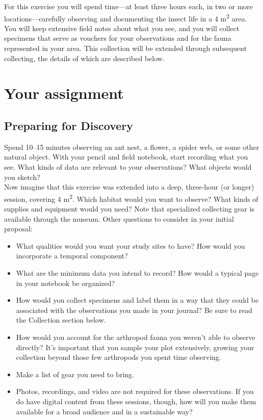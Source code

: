 \documentclass[letterpaper, 11pt]{article}
\begin{document}
\noindent{}For this exercise you will spend time---at least three hours each, in two or more locations---carefully observing and documenting the insect life in a 4 m\textsuperscript{2} area. You will keep extensive field notes about what you see, and you will collect specimens that serve as vouchers for your observations and for the fauna represented in your area. This collection will be extended through subsequent collecting, the details of which are described below.

\section*{Your assignment}

\subsection*{Preparing for Discovery}
Spend 10--15 minutes observing an ant nest, a flower, a spider web, or some other natural object. With your pencil and field notebook, start recording what you see. What kinds of data are relevant to your observations? What objects would you sketch? \\

\noindent{}Now imagine that this exercise was extended into a deep, three-hour (or longer) session, covering 4 m\textsuperscript{2}. Which habitat would you want to observe? What kinds of supplies and equipment would you need? Note that specialized collecting gear is available through the museum. Other questions to consider in your initial proposal:
\begin{itemize}
\item What qualities would you want your study sites to have? How would you incorporate a temporal component? 
\item What are the minimum data you intend to record? How would a typical page in your notebook be organized?
\item How would you collect specimens and label them in a way that they could be associated with the observations you made in your journal? Be sure to read the Collection section below.
\item How would you account for the arthropod fauna you weren't able to observe directly? It's important that you sample your plot extensively, growing your collection beyond those few arthropods you spent time observing. 
\item Make a list of gear you need to bring.
\item Photos, recordings, and video are not required for these observations. If you do have digital content from these sessions, though, how will you make them available for a broad audience and in a sustainable way?
\end{itemize}
\end{document}
